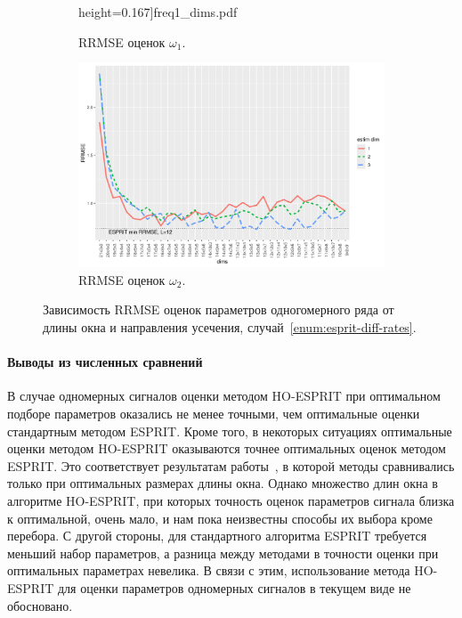 \documentclass[specialist,
  substylefile=spbu_report.rtx,
subf,href,colorlinks=true, 12pt]{disser}
\theoremstyle{plain}
\theoremstyle{definition}
\theoremstyle{remark}
\begin{document}
\begin{figure}[!ht]
\begin{subfigure}{0.49\linewidth}
    height=0.167\textheight]{freq1_dims.pdf}
    \caption{RRMSE оценок $\omega_1$.}
    \label{fig:freq1_dims}
  \end{subfigure}
  \begin{subfigure}{0.49\linewidth}
    \includegraphics[width=\linewidth,
    height=0.167\textheight]{freq2_dims.pdf}
    \caption{RRMSE оценок $\omega_2$.}
    \label{fig:freq2_dims}
  \end{subfigure}
  \caption{Зависимость RRMSE оценок параметров одногомерного ряда
    от длины окна и направления усечения,
  случай~\ref{enum:esprit-diff-rates}.}
  \label{fig:dims_diff_rates}
\end{figure}

\paragraph{Выводы из численных сравнений}
В случае одномерных сигналов оценки методом HO-ESPRIT при оптимальном
подборе параметров
оказались не менее точными, чем оптимальные оценки стандартным методом ESPRIT.
Кроме того, в некоторых ситуациях оптимальные оценки методом
HO-ESPRIT оказываются точнее
оптимальных оценок методом ESPRIT.
Это соответствует результатам работы~\cite{hosvd-hooi-separation}, в
которой методы
сравнивались только при оптимальных размерах длины окна.
Однако множество длин окна в алгоритме HO-ESPRIT, при которых
точность оценок параметров сигнала
близка к оптимальной, очень мало, и нам пока неизвестны способы их
выбора кроме перебора.
С другой стороны, для стандартного алгоритма ESPRIT требуется меньший
набор параметров,
а разница между методами в точности оценки при оптимальных
параметрах невелика.
В связи с этим, использование метода HO-ESPRIT для
оценки параметров одномерных сигналов в
текущем виде не обосновано.
\end{document}
